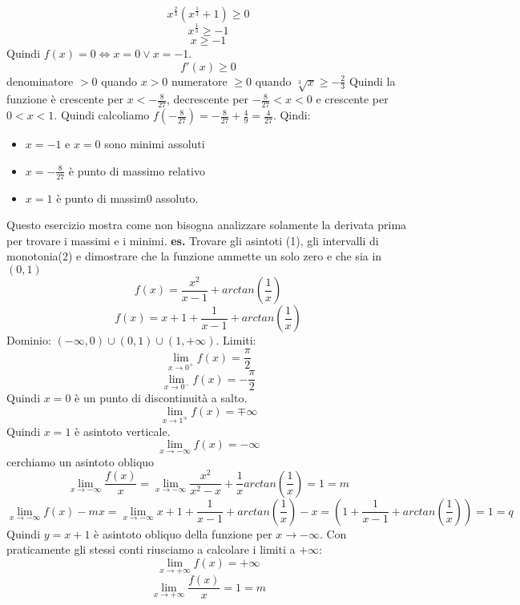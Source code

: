 \[
    x^{\frac{2}{3}}(x^{\frac{1}{3}}+1) \geq 0
\]
\[
    x^{\frac{1}{3}} \geq -1
\]
\[
    x \geq -1
\]
Quindi $f(x)= 0 \Leftrightarrow x= 0 \lor x= -1$.
\[
    f'(x) \geq 0
\]
denominatore $>0 $ quando $x>0$\newline
numeratore $ \geq 0$ quando $\sqrt[3]{x} \geq - \frac{2}{3}$\newline
Quindi la funzione è crescente per $ x < - \frac{8}{27}$, decrescente per $- \frac{8}{27}< x < 0$ e crescente per $0<x<1$.\newline
Quindi calcoliamo $f(-\frac{8}{27}) = -\frac{8}{27} + \frac{4}{9} = \frac{4}{27}$.\newline
Qindi:
\begin{itemize}
    \item $x=-1 $ e $x=0$ sono minimi assoluti
    \item $x = - \frac{8}{27}$ è punto di massimo relativo
    \item $x = 1$ è punto di massim0 assoluto.
\end{itemize} 
Questo esercizio mostra come non bisogna analizzare solamente la derivata prima per trovare i massimi e i minimi. \newline
\newline
\newline
\textbf{es.} Trovare gli asintoti (1), gli intervalli di monotonia(2) e dimostrare che la funzione ammette un solo zero e che sia in $(0,1)$
\[
    f(x) = \frac{x^2}{x-1} + arctan(\frac{1}{x})
\]
\[
    f(x) = x+1 + \frac{1}{x-1} + arctan(\frac{1}{x})
\]
Dominio: $(-\infty, 0) \cup (0,1) \cup (1, +\infty)$.\newline
Limiti:
\[
    \lim_{x\rightarrow 0^+} f(x) = \frac{\pi}{2}
\]
\[
    \lim_{x\rightarrow 0^-} f(x) = -\frac{\pi}{2}
\]
Quindi $x=0$ è un punto di discontinuità a salto.
\[
    \lim_{x\rightarrow 1^{\mp}} f(x) = \mp \infty 
\]
Quindi $x=1$ è asintoto verticale.
\[
    \lim_{x\rightarrow -\infty} f(x) = -\infty
\]
cerchiamo un asintoto obliquo
\[
    \lim_{x\rightarrow -\infty} \frac{f(x)}{x} = \lim_{x\rightarrow -\infty} \frac{x^2}{x^2-x} + \frac{1}{x} arctan(\frac{1}{x}) = 1 = m
\]
\[
    \lim_{x\rightarrow -\infty} f(x) -mx = \lim_{x\rightarrow -\infty} x+1 + \frac{1}{x-1} + arctan(\frac{1}{x}) -x = (1+\frac{1}{x-1} + arctan(\frac{1}{x})) = 1 = q
\]
Quindi $y = x+1$ è asintoto obliquo della funzione per $x \rightarrow - \infty$.\newline
Con praticamente gli stessi conti riusciamo a calcolare i limiti a $+\infty$:
\[
    \lim_{x\rightarrow +\infty} f(x) = + \infty
\]
\[
    \lim_{x\rightarrow +\infty} \frac{f(x)}{x} = 1 = m
\]
